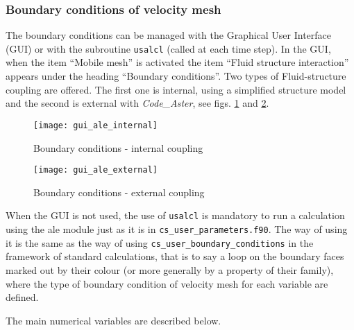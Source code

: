{{{\subsubsection{Boundary conditions of velocity mesh}
The boundary conditions can be managed with the Graphical User Interface (GUI)
 or with the subroutine \texttt{usalcl} (called at each time step). In the GUI,
 when the item ``Mobile mesh'' is activated  the item ``Fluid structure interaction''
 appears under the heading ``Boundary conditions''. Two types of Fluid-structure
 coupling are offered. The first one is internal, using a simplified structure
 model and the second is external with \textit{Code\_Aster}, see figs.
 \ref{fig:CL-ale1} and  \ref{fig:CL-ale2}.
%
\begin{figure}[ht]
\begin{center}
\texttt{[image: gui\_ale\_internal]}
\caption{Boundary conditions - internal coupling}
\label{fig:CL-ale1}
\end{center}
\end{figure}
%
\begin{figure}[ht]
\begin{center}
\texttt{[image: gui\_ale\_external]}
\caption{Boundary conditions - external coupling}
\label{fig:CL-ale2}
\end{center}
\end{figure}

When the GUI is not used, the use of \texttt{usalcl} is mandatory to run
 a calculation using
the ale module just as it is in \texttt{cs\_user\_parameters.f90}. The way of using it
is the same as the way of using \texttt{cs\_user\_boundary\_conditions} in the framework of
standard calculations, that is to say a loop on the boundary faces
marked out by their colour (or more generally by a property of their
family), where the type of boundary condition of velocity mesh for
each variable are defined.

The main numerical variables are described below.

}}}
